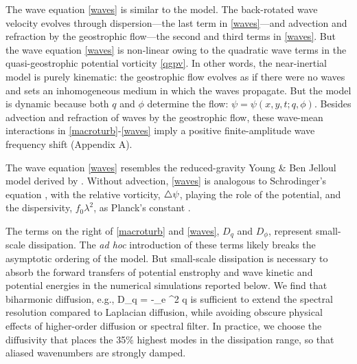 \documentclass{jfm}
\begin{document}
The wave equation \eqref{waves} is similar to the \cite{young_benjelloul1997} model.
The back-rotated wave velocity
evolves through dispersion---the last term in \eqref{waves}---and
advection and refraction by the geostrophic flow---the second and third terms in
\eqref{waves}. But the wave equation \eqref{waves} is non-linear owing to the
quadratic wave terms in the quasi-geostrophic potential vorticity \eqref{qgpv}. In other
words, the
\cite{young_benjelloul1997} near-inertial model is purely kinematic: the geostrophic
flow evolves as if there were no waves and sets an
inhomogeneous medium in which the waves propagate.
But the \cite{xie_vanneste2015} model is dynamic because both $q$ and $\phi$
determine the flow: $\psi=\psi(x,y,t; q, \phi)$. Besides advection and refraction of waves
by the geostrophic flow, these wave-mean interactions in \eqref{macroturb}-\eqref{waves}
imply a positive finite-amplitude wave frequency shift (Appendix A).

The wave equation \eqref{waves} resembles the reduced-gravity
Young \& Ben Jelloul model derived by  \cite{danioux_etal2015}. Without advection,
\eqref{waves} is analogous to Schrodinger's equation
\citep[e.g.,][ pg. 51]{landau_lifshitz2013}, with the relative vorticity, $\triangle\psi$,
playing the role of the
potential, and the dispersivity, $f_0\lambda^2$, as Planck's constant
\citep{danioux_etal2015}.

The terms on the right of
\eqref{macroturb}  and \eqref{waves}, $D_q$ and $D_\phi$, represent small-scale dissipation. The
\textit{ad hoc} introduction of these terms likely breaks the asymptotic ordering of the \cite{xie_vanneste2015}
model. But small-scale dissipation is necessary to absorb the forward transfers
of potential enstrophy and wave kinetic and potential energies in the numerical
simulations reported below.
We find that biharmonic diffusion, e.g.,
\beq
D_q = -\kappa_e \lap^2 q\com
\eeq
is sufficient to extend the spectral resolution compared to Laplacian diffusion, while avoiding
obscure physical effects of higher-order diffusion or spectral
filter.
In practice, we choose the diffusivity that places the 35$\%$ highest
modes in the dissipation range, so that aliased wavenumbers are strongly damped.
\end{document}
